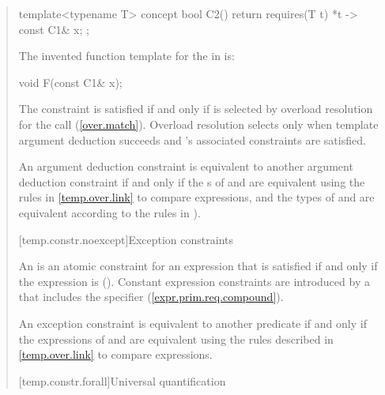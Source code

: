 \begin{quote}
\begin{codeblock}
template<typename T>
concept bool C2() { return requires(T t) { {*t} -> const C1& x; }; }
\end{codeblock}
The invented function template for the
 in
 is:
\begin{codeblock}
void F(const C1& x);
\end{codeblock}
\exitexample
% 
The constraint is satisfied if and only if 
is selected by overload resolution for the call 
(\ref{over.match}).
% 
\enternote
Overload resolution selects  only when template 
argument deduction succeeds and 's associated 
constraints are satisfied.
\exitnote

\pnum
An argument deduction constraint  is equivalent to another 
argument deduction constraint  if and only if the 
s of  and  are equivalent
using the rules in \ref{temp.over.link} to compare expressions, and the types
of  and  are equivalent according to the rules in 
).


[temp.constr.noexcept]{Exception constraints}

\pnum
An  is an atomic constraint
for an expression  that is satisfied if and only
if the expression  is 
().
% 
\enternote
Constant expression constraints are introduced by a
 that
includes the  specifier
(\ref{expr.prim.req.compound}).
\exitnote

\pnum
An exception constraint  is equivalent to another predicate
 if and only if the expressions of  and 
are equivalent using the rules described in \ref{temp.over.link} to compare
expressions.


[temp.constr.forall]{Universal quantification}


\end{quote}
